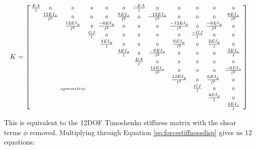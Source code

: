 {\[ K =  \small {\left[ \begin{smallmatrix}
\tfrac{EA}{l} & 0 & 0 & 0 & 0 & 0 & \tfrac{-EA}{l} & 0 & 0 & 0 & 0 & 0\\
 & \tfrac{12EI_z}{l^3} & 0 & 0 & 0 & \tfrac{6EI_z}{l^2} & 0 & \tfrac{-12EI_z}{l^3} & 0 & 0 & 0 & \tfrac{6EI_z}{l^2}\\
 &  & \tfrac{12EI_y}{l^3} & 0 & \tfrac{-6EI_y}{l^2} & 0 & 0 & 0 & \tfrac{-12EI_y}{l^3} & 0 & \tfrac{-6EI_y}{l^2} & 0\\
 &  &  &  \tfrac{GJ}{l} &  0 &  0 &  0 &  0 &  0 & \tfrac{-GJ}{l} & 0 & 0\\
 &  &  &  & \tfrac{4EI_y}{l} & 0 & 0 & 0 & \tfrac{6EI_y}{l^2} & 0 & \tfrac{2EI_y}{l} & 0\\
 &  &  &  &  & \tfrac{4EI_z}{l} & 0 & \tfrac{-6EI_z}{l^2} & 0 & 0 & 0 & \tfrac{2EI_z}{l}\\
 &  &  &  &  &  & \tfrac{EA}{l}  & 0 & 0 & 0 & 0 & 0\\
 &  &  &  &  &  &  & \tfrac{12EI_z}{l^3} & 0 & 0 & 0 & \tfrac{-6EI_z}{l^2}\\
 &  &  &  &  &  &  &  & \tfrac{12EI_y}{l^3} & 0 & \tfrac{6EI_y}{l^2}\ & 0\\
 &  & symmetric &  &  &  &  &  &  & \tfrac{GJ}{l} & 0 & 0\\
 &  &  &  &  &  &  &  &  &  & \tfrac{4EI_y}{l} & 0\\
  &  &  &  &  &  &  &  &  &  &  & \tfrac{4EI_z}{l}\\
 \end{smallmatrix} \right] } \]
 
 This is equivalent to the 12DOF Timoshenko stiffness matrix with the shear terms $\phi$ removed.  Multiplying through Equation \ref{eq:forcestiffnessdisp} gives us 12 equations:

}
